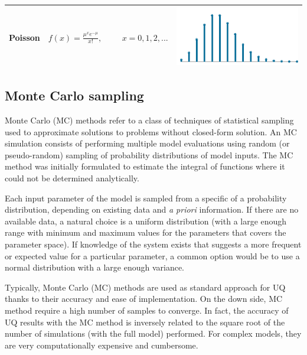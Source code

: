 \documentclass[12pt]{article}
\begin{document}
\begin{table}
\begin{center}
\begin{tabular} {|c | l | c|}
    \rule{0pt}{25pt} Poisson & $f(x)=\frac{\mu^{x}e^{-\mu}}{x!}, \hspace{1cm} x=0,1,2,...$ & \begin{minipage}{3cm}\includegraphics[width=1\textwidth]{images/Poisson_dist.png} \end{minipage}
    
    \\  \hline
    
  \end{tabular}
\end{center}
\end{table}

  \subsection{Monte Carlo sampling}
  
 Monte Carlo (MC) methods refer to a class of techniques of statistical sampling used to approximate solutions to problems without closed-form solution. An MC simulation consists of performing multiple model evaluations using random (or pseudo-random) sampling of probability distributions of model inputs. The MC method was initially formulated to estimate the integral of functions where it could not be determined analytically. 
 
 Each input parameter of the model is sampled from a specific of a probability distribution, depending on existing data and \textit{a priori} information. If there are no available data, a natural choice is a uniform distribution (with a large enough range with minimum and maximum values for the parameters that covers the parameter space). If knowledge of the system exists that suggests a more frequent or expected value for a particular parameter, a common option would be to use a normal distribution with a large enough variance.
  
  Typically, Monte Carlo (MC) methods are used as standard approach for UQ thanks to their accuracy and ease of implementation. On the down side, MC method require a high number of samples to converge. In fact, the accuracy of UQ results with the MC method is inversely related to the square root of the number of simulations (with the full model) performed. For complex models, they are very computationally expensive and cumbersome.  
  
\end{document}
